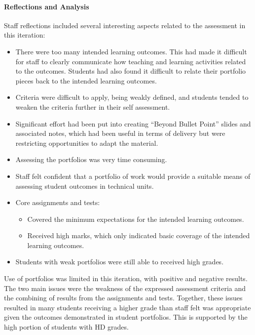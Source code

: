 \paragraph{Reflections and Analysis} %
\label{ssub:analysis}

Staff reflections included several interesting aspects related to the assessment in this iteration:
\begin{itemize}[noitemsep,nolistsep]
  \item There were too many intended learning outcomes. This had made it difficult for staff to clearly communicate how teaching and learning activities related to the outcomes. Students had also found it difficult to relate their portfolio pieces back to the intended learning outcomes.
  \item Criteria were difficult to apply, being weakly defined, and students tended to weaken the criteria further in their self assessment.
  \item Significant effort had been put into creating ``Beyond Bullet Point'' slides and associated notes, which had been useful in terms of delivery but were restricting opportunities to adapt the material.
  \item Assessing the portfolios was very time consuming.
  \item Staff felt confident that a portfolio of work would provide a suitable means of assessing student outcomes in technical units.
  \item Core assignments and tests:
  \begin{itemize}[noitemsep,nolistsep]
    \item Covered the minimum expectations for the intended learning outcomes.
    \item Received high marks, which only indicated basic coverage of the intended learning outcomes. 
  \end{itemize}
  \item Students with weak portfolios were still able to received high grades.
\end{itemize}

Use of portfolios was limited in this iteration, with positive and negative results. The two main issues were the weakness of the expressed assessment criteria and the combining of results from the assignments and tests. Together, these issues resulted in many students receiving a higher grade than staff felt was appropriate given the outcomes demonstrated in student portfolios. This is supported by the high portion of students with HD grades.

